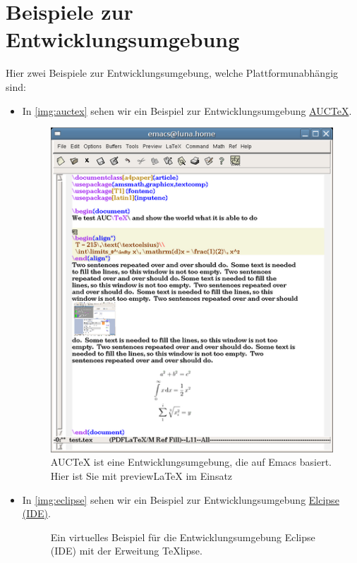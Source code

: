 \section{Beispiele zur Entwicklungsumgebung}
Hier zwei Beispiele zur Entwicklungsumgebung, welche Plattformunabhängig sind:
\begin{itemize}
\item 
In \vref{img:auctex} sehen wir ein Beispiel zur Entwicklungsumgebung \href{https://de.wikipedia.org/wiki/AUCTeX}{AUCTeX}.
\begin{figure}
	\centering
	\includegraphics[width=.5\textwidth]{Auctex}
	\caption[Beispiel zur Entwicklungsumgebung AucTeX.]{AUCTeX ist eine Entwicklungsumgebung, die auf Emacs basiert. Hier ist Sie mit previewLaTeX im Einsatz}
	\label{img:auctex}
\end{figure}
\item
In \vref{img:eclipse} sehen wir ein Beispiel zur Entwicklungsumgebung \href{https://de.wikipedia.org/wiki/Eclipse_(IDE)}{Elcipse (IDE)}.
\begin{figure}
	\centering
	\caption[Eclipse (IDE) mit der Erweiterung TeXlipse.]{Ein virtuelles Beispiel für die Entwicklungsumgebung Eclipse (IDE) mit der Erweitung TeXlipse.}
	\label{img:eclipse}
\end{figure}
\end{itemize}
\clearpage



